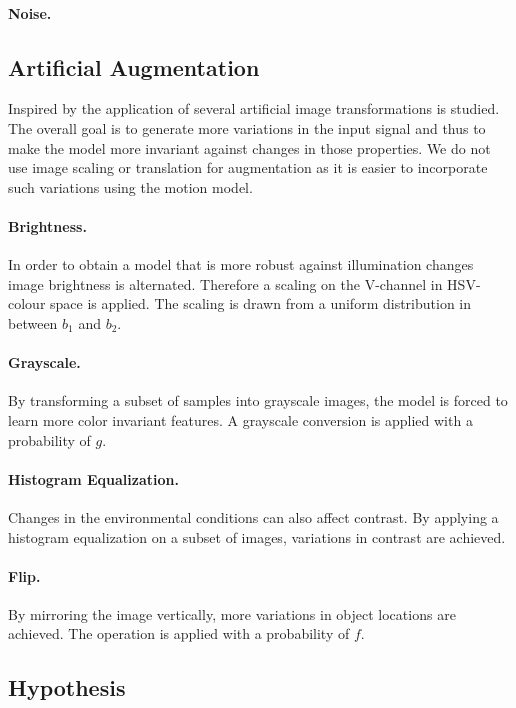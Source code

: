 \paragraph{Noise.}


\subsection{Artificial Augmentation}

Inspired by \cite{Howard2013, Redmon, Liu} the application of several artificial image transformations is studied. The overall goal is to generate more variations in the input signal and thus to make the model more invariant against changes in those properties. We do not use image scaling or translation for augmentation as it is easier to incorporate such variations using the motion model.

\paragraph{Brightness.} In order to obtain a model that is more robust against illumination changes image brightness is alternated. Therefore a scaling on the V-channel in HSV-colour space is applied. The scaling is drawn from a uniform distribution in between $b_1$ and $b_2$.
	
\paragraph{Grayscale.} By transforming a subset of samples into grayscale images, the model is forced to learn more color invariant features. A grayscale conversion is applied with a probability of $g$.
	
\paragraph{Histogram Equalization.} Changes in the environmental conditions can also affect contrast. By applying a histogram equalization on a subset of images, variations in contrast are achieved. 
	
\paragraph{Flip.} By mirroring the image vertically, more variations in object locations are achieved. The operation is applied with a probability of $f$.


\subsection{Hypothesis}
\label{sec:training:hypothesis}


